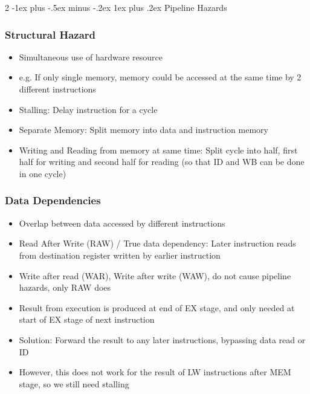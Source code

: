 \documentclass[10pt, portrait]{article}
\makeatletter
\renewcommand{\subsection}{\@startsection{subsection}{3}{0mm}%
                                {-1ex plus -.5ex minus -.2ex}%
                                {1ex plus .2ex}%
                                {\normalfont\small\bfseries}}%
\makeatother
\begin{document}
\begin{multicols*}{2}
\subsection{Pipeline Hazards}
\subsubsection{Structural Hazard}
\begin{itemize}
    \item Simultaneous use of hardware resource
    \item e.g. If only single memory, memory could be accessed at the same time by 2 different instructions
    \item Stalling: Delay instruction for a cycle
    \item Separate Memory: Split memory into data and instruction memory
    \item Writing and Reading from memory at same time: Split cycle into half, first half for writing and second half for reading (so that ID and WB can be done in one cycle)
\end{itemize}

\subsubsection{Data Dependencies}
\begin{itemize}
    \item Overlap between data accessed by different instructions
    \item Read After Write (RAW) / True data dependency: Later instruction reads from destination register written by earlier instruction
    \item Write after read (WAR), Write after write (WAW), do not cause pipeline hazards, only RAW does
    \item Result from execution is produced at end of EX stage, and only needed at start of EX stage of next instruction
    \item Solution: Forward the result to any later instructions, bypassing data read or ID
    \item However, this does not work for the result of LW instructions after MEM stage, so we still need stalling
\end{itemize}


\end{multicols*}
\end{document}
